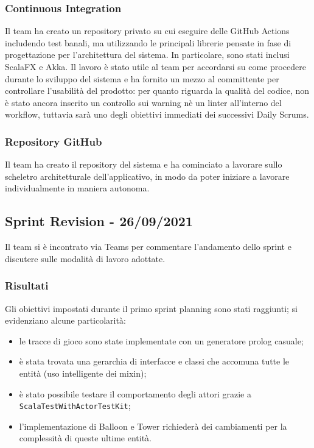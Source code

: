 \subsubsection{Continuous Integration}
Il team ha creato un repository privato su cui eseguire delle GitHub Actions includendo test banali, ma utilizzando le
principali librerie pensate in fase di progettazione per l'architettura del sistema. In particolare, sono stati
inclusi ScalaFX e Akka. Il lavoro è stato utile al team per accordarsi su come procedere durante lo sviluppo del
sistema e ha fornito un mezzo al committente per controllare l'usabilità del prodotto: per quanto riguarda la qualità
del codice, non è stato ancora inserito un controllo sui warning nè un linter all'interno del workflow, tuttavia sarà
uno degli obiettivi immediati dei successivi Daily Scrums.

\subsubsection{Repository GitHub}
Il team ha creato il repository del sistema e ha cominciato a lavorare sullo scheletro architetturale dell'applicativo,
in modo da poter iniziare a lavorare individualmente in maniera autonoma.

\subsection{Sprint Revision - 26/09/2021}
Il team si è incontrato via Teams per commentare l'andamento dello sprint e discutere sulle modalità di lavoro adottate.

\subsubsection{Risultati}
Gli obiettivi impostati durante il primo sprint planning sono stati raggiunti; si evidenziano alcune particolarità:
\begin{itemize}
    \item le tracce di gioco sono state implementate con un generatore prolog casuale;
    \item è stata trovata una gerarchia di interfacce e classi che accomuna tutte le entità (uso intelligente dei mixin);
    \item è stato possibile testare il comportamento degli attori grazie a \texttt{ScalaTestWithActorTestKit};
    \item l'implementazione di Balloon e Tower richiederà dei cambiamenti per la complessità di queste ultime entità.
\end{itemize}

